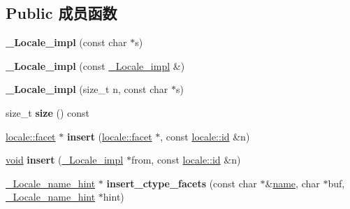 \subsection*{Public 成员函数}
\begin{DoxyCompactItemize}
\item 
\mbox{\label{class___locale__impl_ae0eff2253e98677b0eda7a53ba95db2b}} 
{\bfseries \+\_\+\+Locale\+\_\+impl} (const char $\ast$s)
\item 
\mbox{\label{class___locale__impl_ad7b5b27e5a0be8a0df0ed3116faed89f}} 
{\bfseries \+\_\+\+Locale\+\_\+impl} (const \hyperlink{class___locale__impl}{\+\_\+\+Locale\+\_\+impl} \&)
\item 
\mbox{\label{class___locale__impl_a865dd952a0aaaadf642884b1fb46d9be}} 
{\bfseries \+\_\+\+Locale\+\_\+impl} (size\+\_\+t n, const char $\ast$s)
\item 
\mbox{\label{class___locale__impl_ae76fccf25f88adea7855ce6e58ad59f4}} 
size\+\_\+t {\bfseries size} () const
\item 
\mbox{\label{class___locale__impl_a14b08b3998e29c4818ab2ceb82dd1ea8}} 
\hyperlink{classlocale_1_1facet}{locale\+::facet} $\ast$ {\bfseries insert} (\hyperlink{classlocale_1_1facet}{locale\+::facet} $\ast$, const \hyperlink{classlocale_1_1id}{locale\+::id} \&n)
\item 
\mbox{\label{class___locale__impl_a7d991d6db049b73afd246692d9db392b}} 
\hyperlink{interfacevoid}{void} {\bfseries insert} (\hyperlink{class___locale__impl}{\+\_\+\+Locale\+\_\+impl} $\ast$from, const \hyperlink{classlocale_1_1id}{locale\+::id} \&n)
\item 
\mbox{\label{class___locale__impl_a33e8d4b86ec34f6511a6698f4f692a7b}} 
\hyperlink{struct___locale__name__hint}{\+\_\+\+Locale\+\_\+name\+\_\+hint} $\ast$ {\bfseries insert\+\_\+ctype\+\_\+facets} (const char $\ast$\&\hyperlink{structname}{name}, char $\ast$buf, \hyperlink{struct___locale__name__hint}{\+\_\+\+Locale\+\_\+name\+\_\+hint} $\ast$hint)
\item 
\mbox{\label{class___locale__impl_a0c078fd4178016fcb8193317e08c95d9}} 

\end{DoxyCompactItemize}
